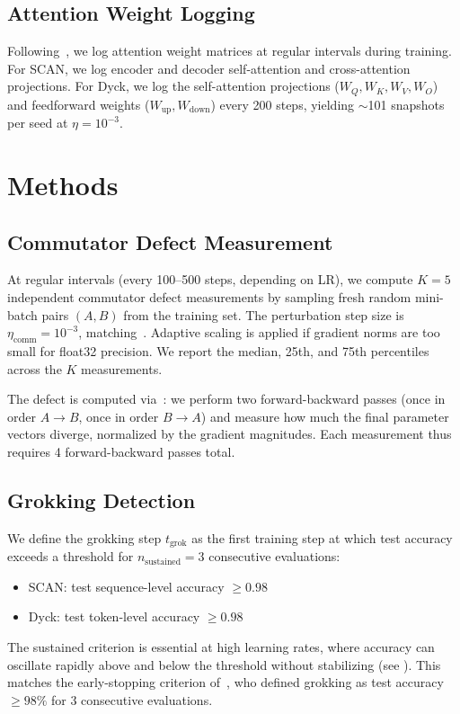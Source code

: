 \documentclass[11pt]{article}
\newcommand{\grokstep}{t_{\text{grok}}}
\begin{document}
\subsection{Attention Weight Logging}

Following~\citet{xu2026integrability}, we log attention weight matrices at regular intervals during training. For SCAN, we log encoder and decoder self-attention and cross-attention projections. For Dyck, we log the self-attention projections ($W_Q, W_K, W_V, W_O$) and feedforward weights ($W_{\text{up}}, W_{\text{down}}$) every 200 steps, yielding $\sim$101 snapshots per seed at $\eta = 10^{-3}$.


\section{Methods}
\label{sec:methods}

\subsection{Commutator Defect Measurement}

At regular intervals (every 100--500 steps, depending on LR), we compute $K = 5$ independent commutator defect measurements by sampling fresh random mini-batch pairs $(A, B)$ from the training set. The perturbation step size is $\eta_{\text{comm}} = 10^{-3}$, matching~\citet{xu2026integrability}. Adaptive scaling is applied if gradient norms are too small for float32 precision. We report the median, 25th, and 75th percentiles across the $K$ measurements.

The defect is computed via~: we perform two forward-backward passes (once in order $A \to B$, once in order $B \to A$) and measure how much the final parameter vectors diverge, normalized by the gradient magnitudes. Each measurement thus requires 4 forward-backward passes total.

\subsection{Grokking Detection}

We define the grokking step $\grokstep$ as the first training step at which test accuracy exceeds a threshold for $n_{\text{sustained}} = 3$ consecutive evaluations:
\begin{itemize}
  \item SCAN: test sequence-level accuracy $\geq 0.98$
  \item Dyck: test token-level accuracy $\geq 0.98$
\end{itemize}
The sustained criterion is essential at high learning rates, where accuracy can oscillate rapidly above and below the threshold without stabilizing (see ). This matches the early-stopping criterion of~\citet{xu2026integrability}, who defined grokking as test accuracy $\geq 98\%$ for 3 consecutive evaluations.
\end{document}

